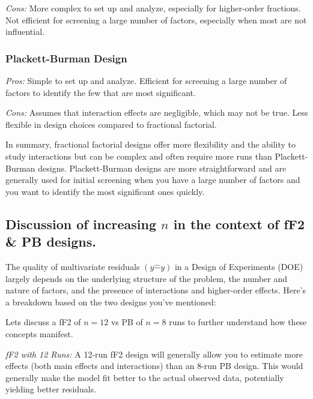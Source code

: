 \documentclass[
  12pt,
  a4paper,
]{article}
\numberwithin{equation}{section}
\theoremstyle{plain}
\theoremstyle{definition}
\theoremstyle{remark}
\theoremstyle{note}
\begin{document}
\emph{Cons:} More complex to set up and analyze, especially for
higher-order fractions. Not efficient for screening a large number of
factors, especially when most are not influential.

\hypertarget{plackett-burman-design-1}{%
\subsubsection{Plackett-Burman Design}\label{plackett-burman-design-1}}

\emph{Pros:} Simple to set up and analyze. Efficient for screening a
large number of factors to identify the few that are most significant.

\emph{Cons:} Assumes that interaction effects are negligible, which may
not be true. Less flexible in design choices compared to fractional
factorial.

In summary, fractional factorial designs offer more flexibility and the
ability to study interactions but can be complex and often require more
runs than Plackett-Burman designs. Plackett-Burman designs are more
straightforward and are generally used for initial screening when you
have a large number of factors and you want to identify the most
significant ones quickly.

\hypertarget{discussion-of-increasing-n-in-the-context-of-ff2-pb-designs.}{%
\subsection{\texorpdfstring{Discussion of increasing \(n\) in the
context of fF2 \& PB
designs.}{Discussion of increasing n in the context of fF2 \& PB designs.}}\label{discussion-of-increasing-n-in-the-context-of-ff2-pb-designs.}}

The quality of multivariate residuals \((y\hat - y)\) in a Design of
Experiments (DOE) largely depends on the underlying structure of the
problem, the number and nature of factors, and the presence of
interactions and higher-order effects. Here's a breakdown based on the
two designs you've mentioned:

Lets discuss a fF2 of \(n=12\) vs PB of \(n=8\) runs to further
understand how these concepts manifest.

\emph{fF2 with 12 Runs:} A 12-run fF2 design will generally allow you to
estimate more effects (both main effects and interactions) than an 8-run
PB design. This would generally make the model fit better to the actual
observed data, potentially yielding better residuals.
\end{document}
